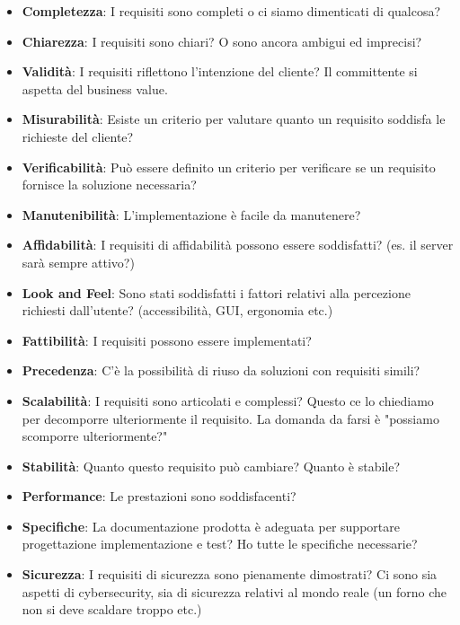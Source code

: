 \begin{itemize}
	\item \textbf{Completezza}: I requisiti sono completi o ci siamo dimenticati di qualcosa?
	\item \textbf{Chiarezza}: I requisiti sono chiari? O sono ancora ambigui ed imprecisi?
	\item \textbf{Validità}: I requisiti riflettono l'intenzione del cliente? Il committente si aspetta del business value.
	\item \textbf{Misurabilità}: Esiste un criterio per valutare quanto un requisito soddisfa le richieste del cliente?
	\item \textbf{Verificabilità}: Può essere definito un criterio per verificare se un requisito fornisce la soluzione necessaria?
	\item \textbf{Manutenibilità}: L'implementazione è facile da manutenere?
	\item \textbf{Affidabilità}: I requisiti di affidabilità possono essere soddisfatti? (es. il server sarà sempre attivo?)
	\item \textbf{Look and Feel}: Sono stati soddisfatti i fattori relativi alla percezione richiesti dall'utente? (accessibilità, GUI, ergonomia etc.)
	\item \textbf{Fattibilità}: I requisiti possono essere implementati?
	\item \textbf{Precedenza}: C'è la possibilità di riuso da soluzioni con requisiti simili?
	\item \textbf{Scalabilità}: I requisiti sono articolati e complessi? Questo ce lo chiediamo per decomporre ulteriormente il requisito. La domanda da farsi è "possiamo scomporre ulteriormente?"
	\item \textbf{Stabilità}: Quanto questo requisito può cambiare? Quanto è stabile?
	\item \textbf{Performance}: Le prestazioni sono soddisfacenti?
	\item \textbf{Specifiche}: La documentazione prodotta è adeguata per supportare progettazione implementazione e test? Ho tutte le specifiche necessarie?
	\item \textbf{Sicurezza}: I requisiti di sicurezza sono pienamente dimostrati? Ci sono sia aspetti di cybersecurity, sia di sicurezza relativi al mondo reale (un forno che non si deve scaldare troppo etc.)
\end{itemize}
